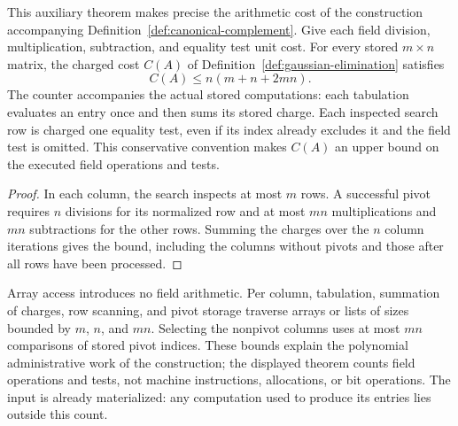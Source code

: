 \begin{theorem}\label{thm:gaussian-elimination-cost}
  \leanok
  This auxiliary theorem makes precise the arithmetic cost of the
  construction accompanying Definition~\ref{def:canonical-complement}.
  Give each field division, multiplication, subtraction, and equality test
  unit cost. For every stored $m\times n$ matrix, the charged cost $C(A)$ of
  Definition~\ref{def:gaussian-elimination} satisfies
  \[
    C(A)\leq n(m+n+2mn).
  \]
  The counter accompanies the actual stored computations: each tabulation
  evaluates an entry once and then sums its stored charge. Each inspected
  search row is charged one equality test, even if its index already
  excludes it and the field test is omitted. This conservative convention
  makes $C(A)$ an upper bound on the executed field operations and tests.
\end{theorem}
\begin{proof}
  \leanok
  In each column, the search inspects at most $m$ rows. A successful pivot
  requires $n$ divisions for its normalized row and at most $mn$
  multiplications and $mn$ subtractions for the other rows. Summing the
  charges over the $n$ column iterations gives the bound, including the
  columns without pivots and those after all rows have been processed.
\end{proof}

Array access introduces no field arithmetic. Per column, tabulation,
summation of charges, row scanning, and pivot storage traverse arrays or
lists of sizes bounded by $m$, $n$, and $mn$. Selecting the nonpivot columns
uses at most $mn$ comparisons of stored pivot indices. These bounds explain
the polynomial administrative work of the construction; the displayed
theorem counts field operations and tests, not machine instructions,
allocations, or bit operations. The input is already materialized: any
computation used to produce its entries lies outside this count.

